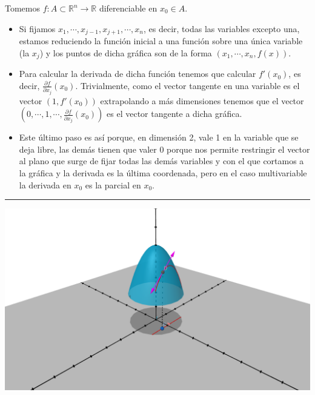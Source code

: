 \documentclass[10pt,a4paper,openright]{book}
\theoremstyle{break}
\begin{document}
Tomemos $f:A\subset \mathbb{R}^n \rightarrow \mathbb{R}$ diferenciable en $x_0\in A$.
\begin{itemize}
\item Si fijamos $x_1, \cdots, x_{j-1}, x_{j+1}, \cdots, x_n$, es decir, todas las variables excepto una, estamos reduciendo la función inicial a una función sobre una única variable (la $x_j$) y los puntos de dicha gráfica son de la forma $(x_1, \cdots, x_n, f(x))$.
\item Para calcular la derivada de dicha función tenemos que calcular $f'(x_0)$, es decir, $\frac{\partial f}{\partial x_j}(x_0)$. Trivialmente, como el vector tangente en una variable es el vector $(1, f'(x_0))$ extrapolando a más dimensiones tenemos que el vector $(0, \cdots, 1, \cdots, \frac{\partial f}{\partial x_j}(x_0))$ es el vector tangente a dicha gráfica.
\item Este último paso es así porque, en dimensión 2, vale 1 en la variable que se deja libre, las demás tienen que valer 0 porque nos permite restringir el vector al plano que surge de fijar todas las demás variables y con el que cortamos a la gráfica y la derivada es la última coordenada, pero en el caso multivariable la derivada en $x_0$ es la parcial en $x_0$.
\end{itemize}

\hrule
\begin{center}
\includegraphics[scale=0.3]{diferencial1}
\end{center}
\end{document}

